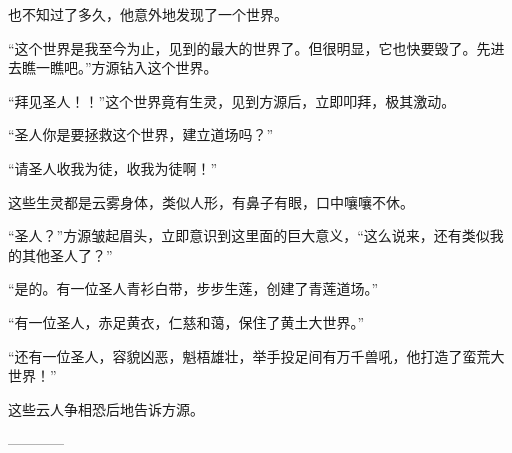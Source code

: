 \begin{this_body}
也不知过了多久，他意外地发现了一个世界。

“这个世界是我至今为止，见到的最大的世界了。但很明显，它也快要毁了。先进去瞧一瞧吧。”方源钻入这个世界。

“拜见圣人！！”这个世界竟有生灵，见到方源后，立即叩拜，极其激动。

“圣人你是要拯救这个世界，建立道场吗？”

“请圣人收我为徒，收我为徒啊！”

这些生灵都是云雾身体，类似人形，有鼻子有眼，口中嚷嚷不休。

“圣人？”方源皱起眉头，立即意识到这里面的巨大意义，“这么说来，还有类似我的其他圣人了？”

“是的。有一位圣人青衫白带，步步生莲，创建了青莲道场。”

“有一位圣人，赤足黄衣，仁慈和蔼，保住了黄土大世界。”

“还有一位圣人，容貌凶恶，魁梧雄壮，举手投足间有万千兽吼，他打造了蛮荒大世界！”

这些云人争相恐后地告诉方源。

------------

\end{this_body}

